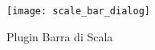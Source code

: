 \begin{figure}[ht]
   \begin{center}
   \caption{Plugin Barra di Scala \nixcaption}\label{fig:scale_bar}\smallskip
   \texttt{[image: scale\_bar\_dialog]}
\end{center}  
\end{figure}

